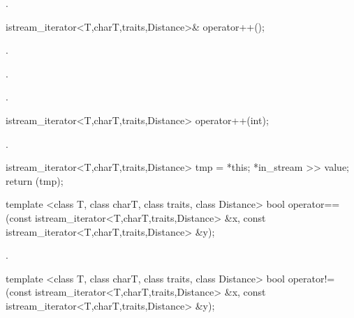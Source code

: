 \begin{itemdescr}
\pnum
\returns
{}.
\end{itemdescr}

%
%
\begin{itemdecl}
istream_iterator<T,charT,traits,Distance>& operator++();
\end{itemdecl}

\begin{itemdescr}
\pnum
\requires {}.

\pnum
\effects
{}.

\pnum
\returns
{}.
\end{itemdescr}

%
%
\begin{itemdecl}
istream_iterator<T,charT,traits,Distance> operator++(int);
\end{itemdecl}

\begin{itemdescr}
\pnum
\requires {}.

\pnum
\effects
\begin{codeblock}
istream_iterator<T,charT,traits,Distance> tmp = *this;
*in_stream >> value;
return (tmp);
\end{codeblock}
\end{itemdescr}

%
%
\begin{itemdecl}
template <class T, class charT, class traits, class Distance>
  bool operator==(const istream_iterator<T,charT,traits,Distance> &x,
                  const istream_iterator<T,charT,traits,Distance> &y);
\end{itemdecl}

\begin{itemdescr}
\pnum
\returns
{}.%
\end{itemdescr}

%
%
\begin{itemdecl}
template <class T, class charT, class traits, class Distance>
  bool operator!=(const istream_iterator<T,charT,traits,Distance> &x,
                  const istream_iterator<T,charT,traits,Distance> &y);
\end{itemdecl}

